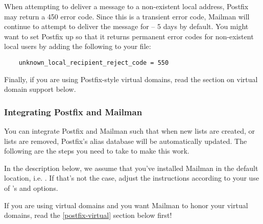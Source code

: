 \documentclass{howto}
\begin{document}
When attempting to deliver a message to a non-existent local address, Postfix
may return a 450 error code.  Since this is a transient error code, Mailman
will continue to attempt to deliver the message for
 -- 5 days by default.  You might want to set
Postfix up so that it returns permanent error codes for non-existent local
users by adding the following to your  file:

\begin{verbatim}
    unknown_local_recipient_reject_code = 550
\end{verbatim}

Finally, if you are using Postfix-style virtual domains, read the section on
virtual domain support below.

\subsubsection{Integrating Postfix and Mailman}

You can integrate Postfix and Mailman such that when new lists are created, or
lists are removed, Postfix's alias database will be automatically updated.
The following are the steps you need to take to make this work.

In the description below, we assume that you've installed Mailman in the
default location, i.e. .  If that's not the case,
adjust the instructions according to your use of 's
 and  options.

\begin{notice}[note]
If you are using virtual domains and you want Mailman to honor your virtual
domains, read the \ref{postfix-virtual} section below first!
\end{notice}
\end{document}
